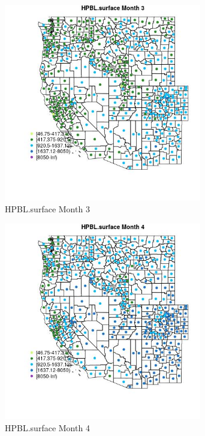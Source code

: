 \begin{figure} 
\centering  
\includegraphics[width=0.77\textwidth]{Code_Outputs/df_report_ML_predictors_CountyCentroid_Locations_Dates_2008-01-01to2018-12-31_MapObsMo3HPBLsurface.jpg} 
\caption{\label{fig:df_report_ML_predictors_CountyCentroid_Locations_Dates_2008-01-01to2018-12-31MapObsMo3HPBLsurface}HPBL.surface Month 3} 
\end{figure} 
 

\begin{figure} 
\centering  
\includegraphics[width=0.77\textwidth]{Code_Outputs/df_report_ML_predictors_CountyCentroid_Locations_Dates_2008-01-01to2018-12-31_MapObsMo4HPBLsurface.jpg} 
\caption{\label{fig:df_report_ML_predictors_CountyCentroid_Locations_Dates_2008-01-01to2018-12-31MapObsMo4HPBLsurface}HPBL.surface Month 4} 
\end{figure} 
 

